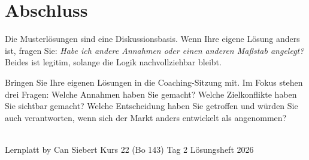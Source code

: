 \documentclass[11pt,a4paper,oneside]{article}
\begin{document}
\clearpage

\section*{Abschluss}
\thispagestyle{plain}

\noindent Die Musterlösungen sind eine Diskussionsbasis. Wenn Ihre eigene Lösung anders ist, fragen Sie: \emph{Habe ich andere Annahmen \textendash{} oder einen anderen Maßstab angelegt?} Beides ist legitim, solange die Logik nachvollziehbar bleibt.

\medskip
\begin{infobox}
Bringen Sie Ihre eigenen Lösungen in die Coaching-Sitzung mit. Im Fokus stehen drei Fragen: Welche Annahmen haben Sie gemacht? Welche Zielkonflikte haben Sie sichtbar gemacht? Welche Entscheidung haben Sie getroffen \textendash{} und würden Sie auch verantworten, wenn sich der Markt anders entwickelt als angenommen?
\end{infobox}

\vspace{1cm}
\noindent{\color{lpAccent}\rule{\linewidth}{0.6pt}}\\[4pt]
{\footnotesize\sffamily\color{lpGray}Lernplatt \textperiodcentered{} by Can Siebert \textperiodcentered{} Kurs 22 (Bo 143) \textperiodcentered{} Tag 2 \textperiodcentered{} Lösungsheft \textperiodcentered{} \textcopyright{} 2026}
\end{document}
